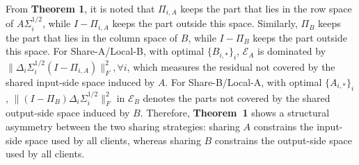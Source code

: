 \documentclass[lettersize,journal]{IEEEtran}
\begin{document}
	From \textbf{Theorem 1}, it is noted that $\Pi_{i,A}$ keeps the part that lies in the row space of $A\Sigma_i^{1/2}$, while $I-\Pi_{i,A}$ keeps the part outside this space. 
	Similarly, $\Pi_B$ keeps the part that lies in the column space of $B$, while $I-\Pi_B$ keeps the part outside this space.
	For Share-A/Local-B, with optimal $\{B_{i,*}\}_i$, $\mathcal{E}_A$ is dominated by $\|\Delta_i\Sigma_i^{1/2}(I-\Pi_{i,A})\|_{F}^2, \forall i$, which measures the residual not covered by the shared input-side space induced by $A$.
	For Share-B/Local-A, with optimal $\{A_{i,*}\}_i$, $\|(I-\Pi_B)\Delta_i\Sigma_i^{1/2}\|_F^2$ in $\mathcal{E}_B$ denotes the parts not covered by the shared output-side space induced by $B$.
	Therefore, \textbf{Theorem~1} shows a structural asymmetry between the two sharing strategies: sharing $A$ constrains the input-side space used by all clients, whereas sharing $B$ constrains the output-side space used by all clients.
	
\end{document}
